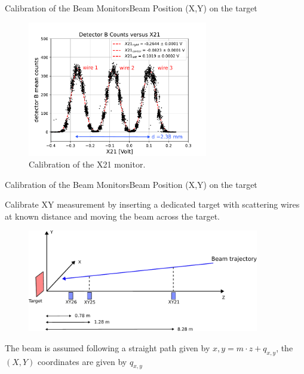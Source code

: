 \documentclass[9pt,a4paper]{beamer}
\begin{document}
\begin{frame}{Calibration of the Beam Monitors}{Beam Position (X,Y) on the target}
\begin{figure}
\includegraphics[width = 0.70\textwidth]{figures/HorizontalCalibration.pdf}
\caption{\footnotesize Calibration of the X21 monitor.}
\end{figure}
\end{frame}

\begin{frame}{Calibration of the Beam Monitors}{Beam Position (X,Y) on the target}

Calibrate XY measurement by inserting a dedicated target with scattering wires at known distance and moving the beam across the target.

\begin{figure}[hbtp]
\centering
\includegraphics[width = 0.9\textwidth]{figures/scheme.pdf}
\end{figure}

The beam is assumed following a straight path given by $x,y = m\cdot z + q_{x,y}$, the $(X,Y)$ coordinates are given by $q_{x,y}$

\end{frame}
\end{document}
